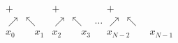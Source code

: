 \begin{gather*}
\begin{array}{c}
+\\
\nearrow\ \nwarrow\\
x_0\qquad x_1
\end{array}
\begin{array}{c}
+\\
\nearrow\ \nwarrow\\
x_2\qquad x_3
\end{array}
\hdots
\begin{array}{c}
+\\
\nearrow\ \nwarrow\\
x_{N-2}\qquad x_{N-1}
\end{array}
\end{gather*}